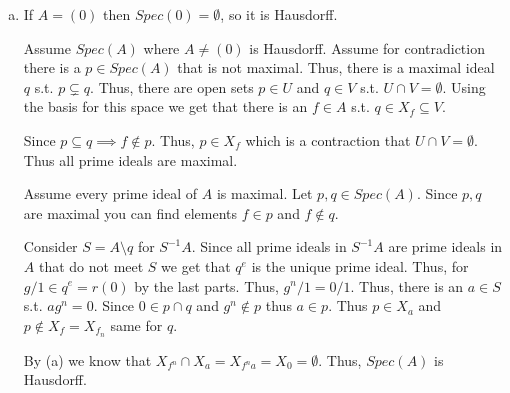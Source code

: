 \documentclass[12pt, letterpaper]{article}
\newcommand{\N}{\mathbb{N}}
\begin{document}
\begin{enumerate}[(a)]
    Let $x \in p$ for all $p \in Spec(A)$. Assume for contraction that $x$ is not nilpotent thus consider $A_x$. Since $0$ was not in our multiplicative set we know that $A_x$ is not the zero ring thus there exists a maximal ideal $m$ thus prime. However this is a contradiction since there is a bijection from primes ideals in $A_x$ to ideals prime ideals of $A$ that do not meet $\{1,x,x^2,\dots\}$. Since $x \in p$ for all $p \in Spec(A)$. This means that $x$ must be nilpotent.

    Therefore, the intersection of all prime ideals is the nilradical.

    Let $I$ be an ideal in $A$. Let $P$ be the intersection of all prime ideals of $A$ containing $I$.

    Let $x \in r(I)$ thus $x^n \in I$ for $n \in \N$. Thus, $x \in P$ by the same reason as above.

    Let $x \notin r(I)$ thus no power of $x$ is in $I$. Consider $A \diagup I$ s.t. the image of $x$ is $y$ consider the set $S=\{1,y,y^2,\dots\}$. Since $x \notin r(I)$ this means that $y$ will not be nilpotent. Thus $(A \setminus I)_{y}$ is non zero thus we can get a maximal ideal $m$ which is prime. Thus, this corresponds to a prime ideal in $A \diagup I$ that does not meet $S$. Now contract this prime in $A \diagup I$ to $A$ and we get a prime ideal in $A$ that contains $I$ but not $x$. Since if it did have $x$ then we can take its image then the prime ideal in $A \diagup I$ would have $y$ which is a contraction of it not having $S$. Thus, $x \notin P$.

    Therefore $r(I)=P$
    
    \item If $A=(0)$ then $Spec(0)=\emptyset$, so it is Hausdorff.
    
    Assume $Spec(A)$ where $A \neq (0)$ is Hausdorff. Assume for contradiction there is a $p \in Spec(A)$ that is not maximal. Thus, there is a maximal ideal $q$ s.t. $p \subsetneq q$. Thus, there are open sets $p \in U$ and $q \in V$ s.t. $U \cap V= \emptyset$. Using the basis for this space we get that there is an $f \in A$ s.t. $q \in X_f \subseteq V$.

    Since $p \subseteq q \implies f \notin p$. Thus, $p \in X_f$ which is a contraction that $U \cap V =\emptyset$. Thus all prime ideals are maximal.

    Assume every prime ideal of $A$ is maximal. Let $p,q \in Spec(A)$. Since $p,q$ are maximal you can find elements $f \in p$ and $f \notin q$.
    
    Consider $S=A \setminus q$ for $S^{-1}A$. Since all prime ideals in $S^{-1}A$ are prime ideals in $A$ that do not meet $S$ we get that $q^e$ is the unique prime ideal. Thus, for $g/1 \in q^e=r(0)$ by the last parts. Thus, $g^n/1=0/1$. Thus, there is an $a \in S$ s.t. $ag^n=0$. Since $0 \in p \cap q$ and $g^n \notin p$ thus $a \in p$. Thus $p \in X_a$ and $p \notin X_f=X_{f_n}$ same for $q$.

    By (a) we know that $X_{f^n} \cap X_{a} = X_{f^na}=X_{0}=\emptyset$. Thus, $Spec(A)$ is Hausdorff.
\end{enumerate}
\end{document}
